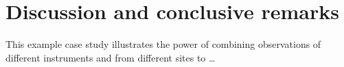 \section{Discussion and conclusive remarks}
This example case study illustrates the power of combining observations of different instruments and from different sites to \ldots